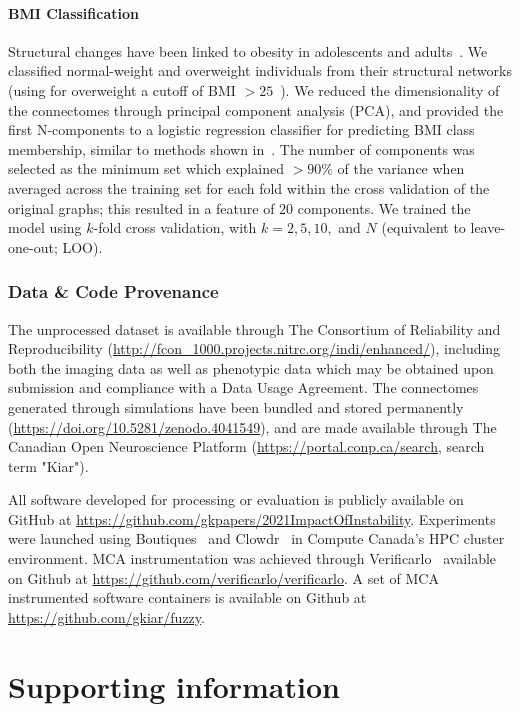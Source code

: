 \documentclass[10pt,letterpaper]{article}
\begin{document}
\paragraph{BMI Classification} Structural changes have been linked to obesity in
adolescents and adults~\cite{Raji2010-lh}. We classified normal-weight and
overweight individuals from their structural networks (using for overweight a cutoff
of BMI $> 25$~\cite{Gupta2015-ap}). We reduced the dimensionality of the connectomes
through principal component analysis (PCA), and provided the first N-components to a
logistic regression classifier for predicting BMI class membership, similar to
methods shown in~\cite{Gupta2015-ap,Park2015-uj}. The number of components was
selected as the minimum set which explained $> 90\%$ of the variance when averaged
across the training set for each fold within the cross validation of the original
graphs; this resulted in a feature of $20$ components. We trained the model using
$k$-fold cross validation, with $k = 2, 5, 10,$ and $N$ (equivalent to
leave-one-out; LOO).

\subsubsection*{Data \& Code Provenance}
The unprocessed dataset is available through The Consortium of Reliability and Reproducibility
(\url{http://fcon_1000.projects.nitrc.org/indi/enhanced/}), including both the imaging data as well as phenotypic data
which may be obtained upon submission and compliance with a Data Usage Agreement. The connectomes generated through
simulations have been bundled and stored permanently (\url{https://doi.org/10.5281/zenodo.4041549}), and are made
available through The Canadian Open Neuroscience Platform (\url{https://portal.conp.ca/search}, search term "Kiar").

All software developed for processing or evaluation is publicly available on GitHub at
\url{https://github.com/gkpapers/2021ImpactOfInstability}. Experiments were launched using
Boutiques~\cite{Glatard2018-tu} and Clowdr~\cite{Kiar2019-sr} in Compute Canada's HPC cluster environment. MCA
instrumentation was achieved through Verificarlo~\cite{Denis2016-wo} available on Github at
\url{https://github.com/verificarlo/verificarlo}. A set of MCA instrumented software containers is available on Github
at \url{https://github.com/gkiar/fuzzy}.

\section*{Supporting information}
\end{document}
